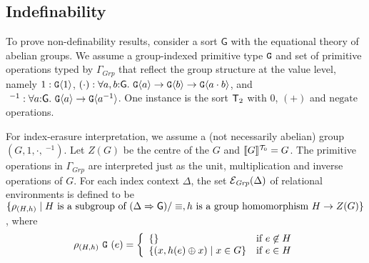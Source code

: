 \subsection{Indefinability}
\label{sec:types-indexed-abelian-groups-indef}
\newcommand{\Grp}{\mathit{Grp}} To prove non-definability results,
consider %
a sort $\mathsf{G}$ with the equational
theory of abelian groups.  We assume a group-indexed primitive type
$\textup{\texttt{G}}$ and set of primitive operations typed by $\Gamma_\Grp$
that reflect the group structure at the value level, namely $1 :
\textup{\texttt{G}}\langle 1 \rangle$, $ (\cdot) : \forall
a,b\mathord:\mathsf{G}.\ \textup{\texttt{G}}\langle a \rangle \to \textup{\texttt{G}}\langle b \rangle \to
\textup{\texttt{G}}\langle a\cdot b \rangle$, and $\ ^{-1} : \forall
a\mathord:\mathsf{G}.\ \textup{\texttt{G}}\langle a \rangle \to \textup{\texttt{G}}\langle a^{-1} \rangle$.
One instance is the sort $\mathsf{T}_2$ with $0$, $(+)$ and
$\mathrm{negate}$ operations.

For index-erasure interpretation, we assume a (not necessarily
abelian) group $(G, 1, \cdot, \ ^{-1})$. Let $Z(G)$ be the centre of
the $G$ %
and $\llbracket G \rrbracket^{\mathcal{T}_0} = G$. The primitive operations
in $\Gamma_\Grp$ are interpreted just as the unit, multiplication and
inverse operations of $G$. For each index context $\Delta$, the set
$\relEnv{E}_\Grp(\Delta)$ of relational environments is defined to be
$\{ \rho_{(H,h)} \mathrel| H\textrm{ is a subgroup of }(\Delta
\Rightarrow \mathsf{G})/\equiv, h\textrm{ is a group homomorphism }H
\to Z(G) \}$, where
\begin{displaymath}
  \rho_{(H,h)}\ \tyPrimNm{G}\ (e) = \left\{
    \begin{array}{ll}
      \{ \} & \textrm{if}\ e\not\in H \\
      \{ (x, h(e)\oplus x) \sepbar x \in G \} & \textrm{if}\ e\in H
    \end{array}
  \right.
\end{displaymath}

